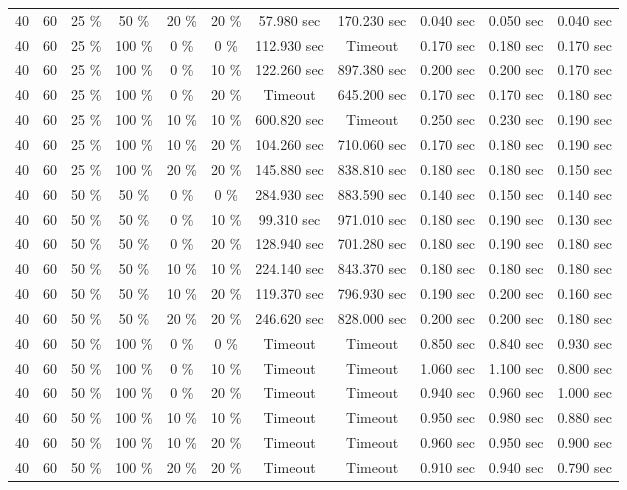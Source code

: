 \documentclass{article}
\begin{document}
\begin{longtable}[]{@{}ccccccccccc@{}}
40 & 60 & 25 \% & 50 \% & 20 \% & 20 \% & 57.980 sec & 170.230 sec & 0.040 sec & 0.050 sec & 0.040 sec \\
40 & 60 & 25 \% & 100 \% & 0 \% & 0 \% & 112.930 sec & Timeout & 0.170 sec & 0.180 sec & 0.170 sec \\
40 & 60 & 25 \% & 100 \% & 0 \% & 10 \% & 122.260 sec & 897.380 sec & 0.200 sec & 0.200 sec & 0.170 sec \\
40 & 60 & 25 \% & 100 \% & 0 \% & 20 \% & Timeout & 645.200 sec & 0.170 sec & 0.170 sec & 0.180 sec \\
40 & 60 & 25 \% & 100 \% & 10 \% & 10 \% & 600.820 sec & Timeout & 0.250 sec & 0.230 sec & 0.190 sec \\
40 & 60 & 25 \% & 100 \% & 10 \% & 20 \% & 104.260 sec & 710.060 sec & 0.170 sec & 0.180 sec & 0.190 sec \\
40 & 60 & 25 \% & 100 \% & 20 \% & 20 \% & 145.880 sec & 838.810 sec & 0.180 sec & 0.180 sec & 0.150 sec \\
40 & 60 & 50 \% & 50 \% & 0 \% & 0 \% & 284.930 sec & 883.590 sec & 0.140 sec & 0.150 sec & 0.140 sec \\
40 & 60 & 50 \% & 50 \% & 0 \% & 10 \% & 99.310 sec & 971.010 sec & 0.180 sec & 0.190 sec & 0.130 sec \\
40 & 60 & 50 \% & 50 \% & 0 \% & 20 \% & 128.940 sec & 701.280 sec & 0.180 sec & 0.190 sec & 0.180 sec \\
40 & 60 & 50 \% & 50 \% & 10 \% & 10 \% & 224.140 sec & 843.370 sec & 0.180 sec & 0.180 sec & 0.180 sec \\
40 & 60 & 50 \% & 50 \% & 10 \% & 20 \% & 119.370 sec & 796.930 sec & 0.190 sec & 0.200 sec & 0.160 sec \\
40 & 60 & 50 \% & 50 \% & 20 \% & 20 \% & 246.620 sec & 828.000 sec & 0.200 sec & 0.200 sec & 0.180 sec \\
40 & 60 & 50 \% & 100 \% & 0 \% & 0 \% & Timeout & Timeout & 0.850 sec & 0.840 sec & 0.930 sec \\
40 & 60 & 50 \% & 100 \% & 0 \% & 10 \% & Timeout & Timeout & 1.060 sec & 1.100 sec & 0.800 sec \\
40 & 60 & 50 \% & 100 \% & 0 \% & 20 \% & Timeout & Timeout & 0.940 sec & 0.960 sec & 1.000 sec \\
40 & 60 & 50 \% & 100 \% & 10 \% & 10 \% & Timeout & Timeout & 0.950 sec & 0.980 sec & 0.880 sec \\
40 & 60 & 50 \% & 100 \% & 10 \% & 20 \% & Timeout & Timeout & 0.960 sec & 0.950 sec & 0.900 sec \\
40 & 60 & 50 \% & 100 \% & 20 \% & 20 \% & Timeout & Timeout & 0.910 sec & 0.940 sec & 0.790 sec \\

\end{longtable}
\end{document}
